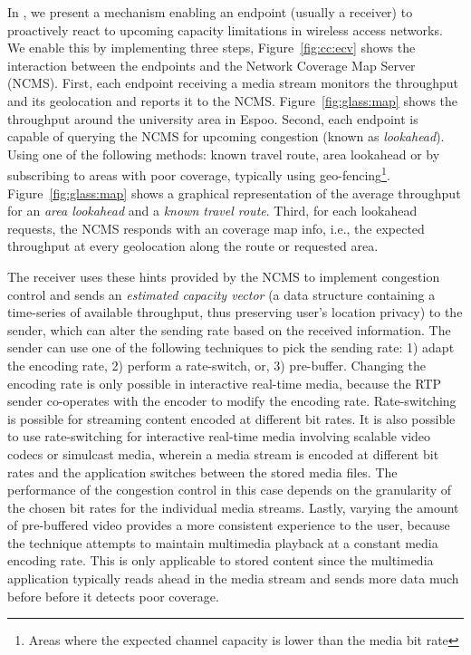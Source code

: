 In , we present a mechanism enabling an endpoint (usually a
receiver) to proactively react to upcoming capacity limitations in wireless
access networks. We enable this by implementing three steps,
Figure~\ref{fig:cc:ecv} shows the interaction between the endpoints and the
Network Coverage Map Server (NCMS). First, each endpoint receiving a media
stream monitors the throughput and its geolocation and reports it to the NCMS.
Figure~\ref{fig:glass:map} shows the throughput around the university area in
Espoo. Second, each endpoint is capable of querying the NCMS for upcoming
congestion (known as \emph{lookahead}). Using one of
the following methods: known travel route, area lookahead or by subscribing to
areas with poor coverage, typically using geo-fencing\footnote{Areas where the
expected channel capacity is lower than the media bit rate}.
Figure~\ref{fig:glass:map} shows a graphical representation of the average
throughput for an \emph{area lookahead} and a \emph{known travel route}. Third,
for each lookahead requests, the NCMS responds with an coverage map info,
i.e., the expected throughput at every geolocation along the route or
requested area.

The receiver uses these hints provided by the NCMS to implement congestion
control and sends an \emph{estimated capacity vector} (a data structure
containing a time-series of available throughput, thus preserving user's
location privacy) to the sender, which can alter the sending rate based on the
received information. The sender can use one of the following techniques to pick the
sending rate: 1) adapt the encoding rate, 2) perform a rate-switch, or, 3)
pre-buffer. Changing the encoding rate is only possible in interactive 
real-time media, because the RTP sender co-operates with the encoder to  modify the
encoding rate. Rate-switching is possible for streaming content  encoded at
different bit rates. It is also possible to use rate-switching  for
interactive real-time media involving scalable video codecs or simulcast
media, wherein a media stream is encoded at different bit rates and the
application switches between the stored media files. The performance of the
congestion control in this case depends on the granularity of the chosen bit
rates for the individual media streams. Lastly, varying the amount of 
pre-buffered video provides a more consistent experience to the user,  because the
technique attempts to maintain multimedia playback at a constant media
encoding rate. This is only applicable to stored content since the multimedia 
application typically reads ahead in the media stream and sends more data 
much before before it detects poor coverage.

